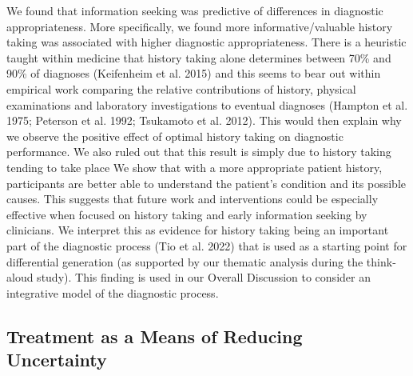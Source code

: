 \documentclass[a4paper, nobind]{templates/ociamthesis}
\begin{document}
We found that information seeking was predictive of differences in diagnostic appropriateness. More specifically, we found more informative/valuable history taking was associated with higher diagnostic appropriateness. There is a heuristic taught within medicine that history taking alone determines between 70\% and 90\% of diagnoses (Keifenheim et al. 2015) and this seems to bear out within empirical work comparing the relative contributions of history, physical examinations and laboratory investigations to eventual diagnoses (Hampton et al. 1975; Peterson et al. 1992; Tsukamoto et al. 2012). This would then explain why we observe the positive effect of optimal history taking on diagnostic performance. We also ruled out that this result is simply due to history taking tending to take place We show that with a more appropriate patient history, participants are better able to understand the patient's condition and its possible causes. This suggests that future work and interventions could be especially effective when focused on history taking and early information seeking by clinicians. We interpret this as evidence for history taking being an important part of the diagnostic process (Tio et al. 2022) that is used as a starting point for differential generation (as supported by our thematic analysis during the think-aloud study). This finding is used in our Overall Discussion to consider an integrative model of the diagnostic process.

\subsection{Treatment as a Means of Reducing Uncertainty}\label{treatment-as-a-means-of-reducing-uncertainty}
\end{document}
